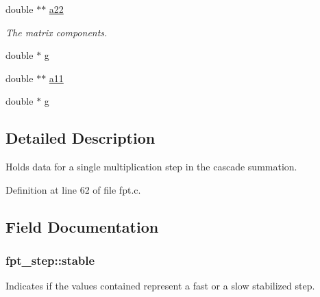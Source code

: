 \begin{CompactItemize}
\item 
\hypertarget{structfpt__step_8b9d47817a329590e3b682d5aff32757}{
double $\ast$$\ast$ \hyperlink{structfpt__step_8b9d47817a329590e3b682d5aff32757}{a22}}
\label{structfpt__step_8b9d47817a329590e3b682d5aff32757}

\begin{CompactList}\small\item\em The matrix components. \item\end{CompactList}\item 
\hypertarget{structfpt__step_10ab542d17516864abb0f6bd4208b28c}{
double $\ast$ \hyperlink{structfpt__step_10ab542d17516864abb0f6bd4208b28c}{g}}
\label{structfpt__step_10ab542d17516864abb0f6bd4208b28c}

\item 
\hypertarget{structfpt__step_a8244629c19851a1266b09faf47bfcaf}{
double $\ast$$\ast$ \hyperlink{structfpt__step_a8244629c19851a1266b09faf47bfcaf}{a11}}
\label{structfpt__step_a8244629c19851a1266b09faf47bfcaf}

\item 
\hypertarget{structfpt__step_10ab542d17516864abb0f6bd4208b28c}{
double $\ast$ \hyperlink{structfpt__step_10ab542d17516864abb0f6bd4208b28c}{g}}
\label{structfpt__step_10ab542d17516864abb0f6bd4208b28c}

\end{CompactItemize}


\subsection{Detailed Description}
Holds data for a single multiplication step in the cascade summation. 

Definition at line 62 of file fpt.c.

\subsection{Field Documentation}
\hypertarget{structfpt__step_3923c1a18d2a92dc3213d4ce7ac9c72d}{
\subsubsection{ {\bf fpt\_\-step::stable}}}
\label{structfpt__step_3923c1a18d2a92dc3213d4ce7ac9c72d}


Indicates if the values contained represent a fast or a slow stabilized step. 



